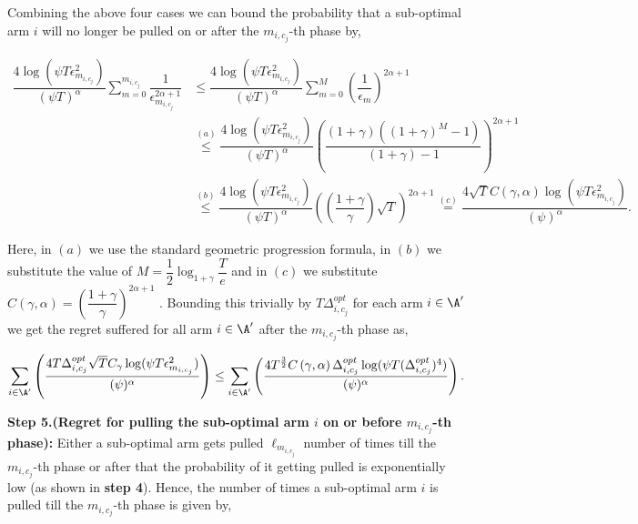 \begin{customproof}{3}
Combining the above four cases we can bound the probability that a sub-optimal arm $i$ will no longer be pulled on or after the $m_{i,c_j}$-th phase by,

\begin{align*}
\dfrac{4\log(\psi T \epsilon_{m_{i,c_j}}^2)}{(\psi T)^{\alpha}}\sum_{m=0}^{m_{i,c_j}}\dfrac{1}{\epsilon_{m_{i,c_j}}^{2\alpha +1}} &\leq \dfrac{4\log(\psi T \epsilon_{m_{i,c_j}}^2)}{(\psi T)^{\alpha}}\sum_{m=0}^{M}\left(\dfrac{1}{\epsilon_{m}}\right)^{2\alpha +1}\\
& \overset{(a)}{\leq} \dfrac{4\log(\psi T \epsilon_{m_{i,c_j}}^2)}{(\psi T)^{\alpha}}\left(\dfrac{(1+\gamma)((1+\gamma)^M - 1)}{(1+\gamma) - 1}\right)^{2\alpha +1} \\
&\overset{(b)}{\leq} \dfrac{4\log(\psi T \epsilon_{m_{i,c_j}}^2)}{(\psi T)^{\alpha}}\left( \left( \dfrac{1+\gamma}{\gamma}\right) \sqrt{T}\right)^{2\alpha +1} \overset{(c)}{=} \dfrac{4\sqrt{T}C\left(\gamma, \alpha \right)\log(\psi T \epsilon_{m_{i,c_j}}^2)}{(\psi)^{\alpha}}.
\end{align*}

Here, in $(a)$ we use the standard geometric progression formula, in $(b)$ we substitute the value of $M=\dfrac{1}{2}\log_{1+\gamma}\dfrac{T}{e}$ and in $(c)$ we substitute $C\left(\gamma, \alpha \right)= \left( \dfrac{1+\gamma}{\gamma}\right)^{2\alpha + 1}$ . Bounding this trivially by $T\Delta^{opt}_{i,c_j}$ for each arm $i\in\A'$ we get the regret suffered for all arm $i\in\A'$ after the $m_{i,c_j}$-th phase  as,

\begin{align*}
\sum_{i\in\A'}\left( \dfrac{4T\Delta^{opt}_{i,c_j}\sqrt{T}C_{\gamma}\log(\psi T \epsilon_{m_{i,c_j}}^2)}{(\psi)^{\alpha}} \right) \leq \sum_{i\in\A'}\left( \dfrac{4T^{\frac{3}{2}}C\left(\gamma, \alpha \right)\Delta^{opt}_{i,c_j}\log(\psi T (\Delta^{opt}_{i,c_j})^4)}{(\psi)^{\alpha}} \right).
\end{align*}



\textbf{Step 5.(Regret for pulling the sub-optimal arm $i$ on or before $m_{i,c_j}$-th phase):} Either a sub-optimal arm gets pulled $\ell_{m_{i,c_j}}$ number of times till the $m_{i,c_j}$-th phase or after that the probability of it getting pulled is exponentially low (as shown in \textbf{step 4}). Hence, the number of times a sub-optimal arm $i$ is pulled till the $m_{i,c_j}$-th phase is given by,


\end{customproof}

